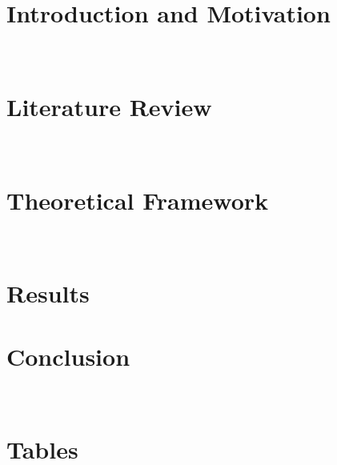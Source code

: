 \documentclass[letterpaper, **24pt**]{article}
\begin{document}
\begin{doublespace}
\begingroup
	\section{Introduction and Motivation}\hfill\\
		\let\clearpage\relax
			
\endgroup
\begingroup
	\section{Literature Review}\hfill\\
		\let\clearpage\relax
			
			
\endgroup
\begingroup
	\section{Theoretical Framework}\hfill\\
		\let\clearpage\relax
			
			
			
\endgroup
\begingroup
	\section{Results}\hfill
		\let\clearpage\relax
			
\endgroup
\begingroup
	\section{Conclusion}\hfill\\
		\let\clearpage\relax
			
\endgroup

\begingroup
\let\clearpage\relax
\appendix
			\section{Tables}
			
			
			
			
\endgroup		

\end{doublespace}
\end{document}
